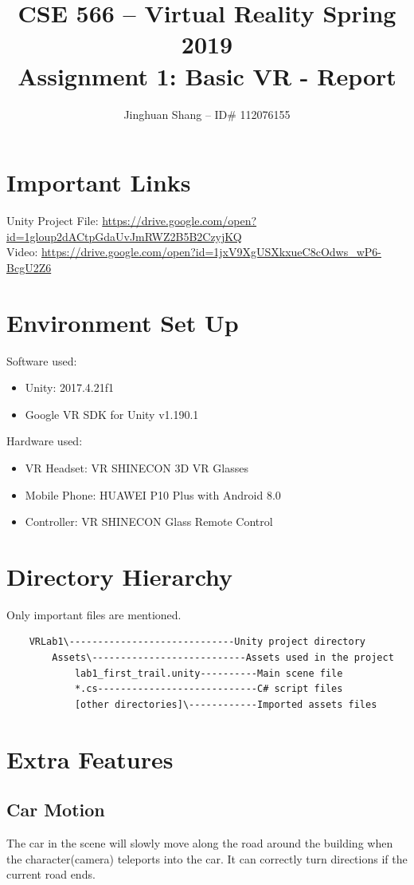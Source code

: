 \documentclass[11pt]{article}
\title{\bf CSE 566 -- 
	Virtual Reality Spring  2019 \\
	Assignment 1: Basic VR - Report \\
}
\author{Jinghuan Shang -- ID\# 112076155}
\begin{document}
	\maketitle
	\section{Important Links}
	Unity Project File: \url{https://drive.google.com/open?id=1gloup2dACtpGdaUvJmRWZ2B5B2CzyjKQ}\\
	Video: \url{https://drive.google.com/open?id=1jxV9XgUSXkxueC8cOdws_wP6-BcgU2Z6}\\
	\section{Environment Set Up}
	Software used:
	\begin{itemize}
		\item Unity: 2017.4.21f1
		\item Google VR SDK for Unity v1.190.1\cite{googlevrsdk}
	\end{itemize}
	Hardware used: 
	\begin{itemize}
		\item VR Headset: VR SHINECON 3D VR Glasses
		\item Mobile Phone: HUAWEI P10 Plus with Android 8.0
		\item Controller: VR SHINECON Glass Remote Control
	\end{itemize}
	
	\section{Directory Hierarchy}
	Only important files are mentioned.
	\begin{lstlisting}
	VRLab1\-----------------------------Unity project directory
		Assets\---------------------------Assets used in the project
			lab1_first_trail.unity----------Main scene file
			*.cs----------------------------C# script files
			[other directories]\------------Imported assets files\end{lstlisting}
	
	
	\section{Extra Features}
	\subsection{Car Motion}
	The car in the scene will slowly move along the road around the building when the character(camera) teleports into the car. It can correctly turn directions if the current road ends.
\end{document}
